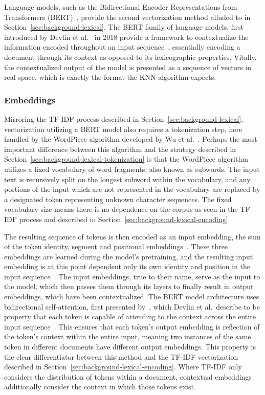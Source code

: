 \documentclass[11pt]{article}
\theoremstyle{plain}
\theoremstyle{definition}
\begin{document}
Language models, such as the Bidirectional Encoder Representations from Transformers (BERT)~\cite{devlin/2018/bert}, provide the second vectorization method alluded to in Section~\ref{sec:background-lexical}. The BERT family of language models, first introduced by Devlin et al.\ \cite{devlin/2018/bert} in 2018 provide a framework to contextualize the information encoded throughout an input sequence~\cite{jurafsky/2026/speech}, essentially encoding a document through its context as opposed to its lexicographic properties. Vitally, the contextualized output of the model is presented as a sequence of vectors in real space, which is exactly the format the KNN algorithm expects.

\subsubsection{Embeddings}\label{sec:background-contextual-embeddings}

Mirroring the TF-IDF process described in Section~\ref{sec:background-lexical}, vectorization utilizing a BERT model also requires a tokenization step, here handled by the WordPiece algorithm developed by Wu et al.\ \cite{wu/2016/googles}. Perhaps the most important difference between this algorithm and the strategy described in Section~\ref{sec:background-lexical-tokenization} is that the WordPiece algorithm utilizes a fixed vocabulary of word fragments, also known as subwords. The input text is recursively split on the longest subword within the vocabulary, and any portions of the input which are not represented in the vocabulary are replaced by a designated token representing unknown character sequences. The fixed vocabulary size means there is no dependence on the corpus as seen in the TF-IDF process and described in Section~\ref{sec:background-lexical-encoding}.

The resulting sequence of tokens is then encoded as an input embedding, the sum of the token identity, segment and positional embeddings~\cite{devlin/2018/bert}. These three embeddings are learned during the model's pretraining, and the resulting input embedding is at this point dependent only its own identity and position in the input sequence~\cite{kubek/2025/selfimproving, huang/2021/multiplicative}. The input embeddings, true to their name, serve as the input to the model, which then passes them through its layers to finally result in output embeddings, which have been contextualized. The BERT model architecture uses bidirectional self-attention, first presented by~\cite{vaswani/2017/attention}, which Devlin et al.\ describe to be property that each token is capable of attending to the context across the entire input sequence~\cite{devlin/2018/bert}. This ensures that each token's output embedding is reflection of the token's context within the entire input, meaning two instances of the same token in different documents have different output embeddings. This property is the clear differentiator between this method and the TF-IDF vectorization described in Section~\ref{sec:background-lexical-encoding}. Where TF-IDF only considers the distribution of tokens within a document, contextual embeddings additionally consider the context in which those tokens exist.
\end{document}
